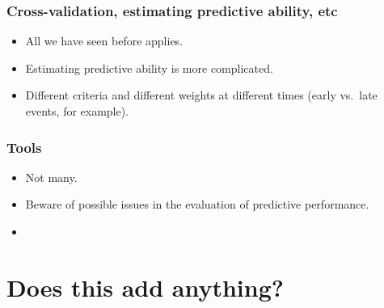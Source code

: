 \begin{frame}
  \frametitle{Cross-validation, estimating predictive ability, etc}
  \begin{itemize}
  \item All we have seen before applies.
  \item Estimating predictive ability is more complicated.
  \item Different criteria and different weights at different times (early
    vs.\ late events, for example).
  \end{itemize}
\end{frame}


\begin{frame}
  \frametitle{Tools}
  \begin{itemize}
  \item Not many.
  \item Beware of possible issues in the evaluation of predictive performance.
  \item {}
  \end{itemize}
\end{frame}

\section[Added value]{Does this add anything?}
\subsection{}






